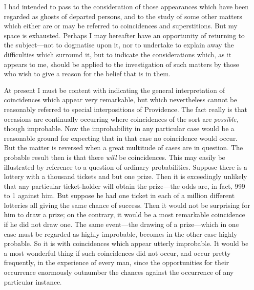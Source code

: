 \documentclass[letterpaper,12pt,oneside,openany]{memoir}
\begin{document}
I had intended to pass to the consideration of those
appearances which have been regarded as ghosts
of departed persons, and to the study of some other
matters which either are or may be referred to coincidences
and superstitions. But my space is exhausted.
Perhaps I may hereafter have an opportunity of
returning to the subject---not to dogmatise upon it,
nor to undertake to explain away the difficulties which
surround it, but to indicate the considerations which,
as it appears to me, should be applied to the investigation
of such matters by those who wish to give a reason
for the belief that is in them.

At present I must be content with indicating the
general interpretation of coincidences which appear
very remarkable, but which nevertheless cannot be
reasonably referred to special interpositions of Providence.
The fact really is that occasions are continually
occurring where coincidences of the sort are \emph{possible},
though improbable. Now the improbability in any
particular case would be a reasonable ground for
expecting that in that case no coincidence would
occur. But the matter is reversed when a great multitude
of cases are in question. The probable result
then is that there \textit{will} be coincidences. This may
easily be illustrated by reference to a question of
ordinary probabilities. Suppose there is a lottery
with a thousand tickets and but one prize. Then it is
exceedingly unlikely that any particular ticket-holder
will obtain the prize---the odds are, in fact, 999 to 1
against him. But suppose he had one ticket in each
of a million different lotteries all giving the same
chance of success. Then it would not be surprising
for him to draw a prize; on the contrary, it would be
a most remarkable coincidence if he did not draw one.
The same event---the drawing of a prize---which in
one case must be regarded as highly improbable,
becomes in the other case highly probable. So it is
with coincidences which appear utterly improbable.
It would be a most wonderful thing if such coincidences
did not occur, and occur pretty frequently, in
the experience of every man, since the opportunities
for their occurrence enormously outnumber the chances
against the occurrence of any particular instance.
\end{document}
